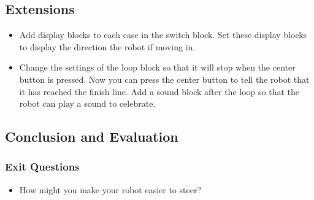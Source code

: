 \documentclass{lessonplan}
\begin{document}
    \subsection{Extensions}
      \begin{itemize}
        \item Add display blocks to each case in the switch block. Set these display blocks to display the direction the robot if moving in.
        \item Change the settings of the loop block so that it will stop when the center button is pressed. Now you can press the center button to tell the robot that it has reached the finish line. Add a sound block after the loop so that the robot can play a sound to celebrate.
      \end{itemize}
    \subsection{Conclusion and Evaluation}
      \subsubsection{Exit Questions}
      \begin{itemize}
        \item How might you make your robot easier to steer?
      \end{itemize}
\end{document}
